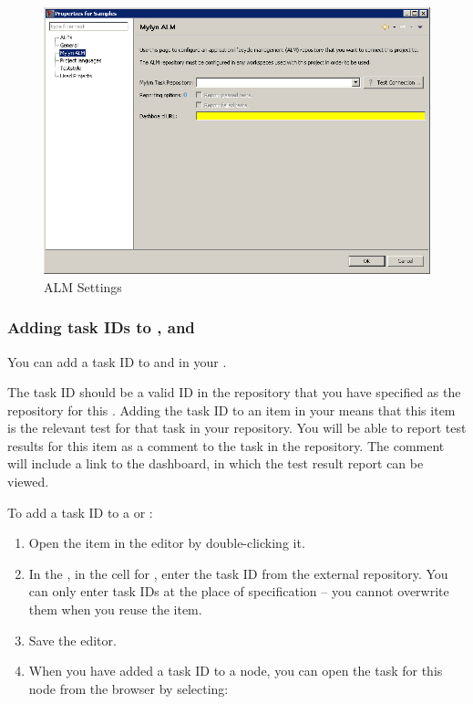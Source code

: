 \begin{figure}[h]
\begin{center}
\includegraphics[width=12.5cm]{Tasks/ALM/PS/almproperties}
\caption{ALM Settings}
\label{TasksALMProjectProperties}
\end{center}
\end{figure}



\subsubsection{Adding task IDs to \gdjobs{}, \gdsuites{} and \gdcases{}}
\label{TasksALMAddTask}

You can add a task ID to \gdcases{} and \gdsuites{} in your \gdproject{}. 

The task ID should be a valid ID in the repository that you have specified as the repository for this \gdproject{} . Adding the task ID to an item in your \gdproject{} means that this item is the relevant test for that task in your repository. You will be able to report test results for this item as a comment to the task in the repository. The comment will include a link to the dashboard, in which the test result report can be viewed.

To add a task ID to a \gdcase{} or \gdsuite{}:
\begin{enumerate}
\item Open the item in the editor by double-clicking it.
\item In the \gdpropview{}, in the cell for , enter the task ID from the external repository. You can only enter task IDs at the place of specification -- you cannot overwrite them when you reuse the item.
\item Save the editor. 
\item When you have added a task ID to a node, you can open the task for this node from the browser by selecting:\\
\end{enumerate}

